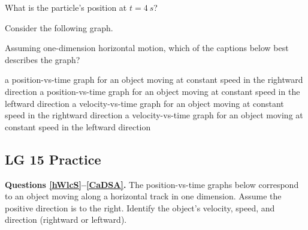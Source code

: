 \documentclass[]{exam}
\begin{document}
\begin{questions}
What is the particle's position at $t = \SI{4}{s}$?

\question
Consider the following graph.

\begin{center}
\end{center}

Assuming one-dimension horizontal motion, which of the captions below best describes the graph?

\begin{randomizechoices}
    \correctchoice a position-vs-time graph for an object moving at constant speed in the rightward direction
    \choice a position-vs-time graph for an object moving at constant speed in the leftward direction
    \choice a velocity-vs-time graph for an object moving at constant speed in the rightward direction
    \choice a velocity-vs-time graph for an object moving at constant speed in the leftward direction
\end{randomizechoices}


\end{questions}

\clearpage

\subsection*{LG 15 Practice}

\textbf{Questions \ref{hWlcS}--\ref{CaDSA}.} The position-vs-time graphs below correspond to an object moving along a horizontal track in one dimension. Assume the positive direction is to the right. Identify the object's velocity, speed, and direction (rightward or leftward).
\end{document}
